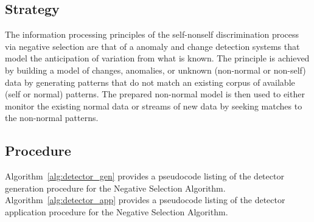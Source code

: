 \subsection{Strategy}
The information processing principles of the self-nonself discrimination process via negative selection are that of a anomaly and change detection systems that model the anticipation of variation from what is known.
The principle is achieved by building a model of changes, anomalies, or unknown (non-normal or non-self) data by generating patterns that do not match an existing corpus of available (self or normal) patterns. The prepared non-normal model is then used to either monitor the existing normal data or streams of new data by seeking matches to the non-normal patterns.

\subsection{Procedure}
Algorithm~\ref{alg:detector_gen} provides a pseudocode listing of the detector generation procedure for the Negative Selection Algorithm. Algorithm~\ref{alg:detector_app} provides a pseudocode listing of the detector application procedure for the Negative Selection Algorithm.

